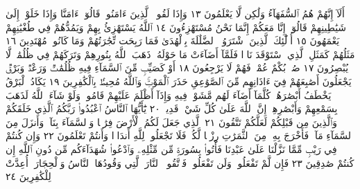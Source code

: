 \documentclass{article}
\begin{document}
أَلَآ إِنَّهُمْ هُمُ ٱلسُّفَهَآءُ وَلَٰكِن لَّا يَعْلَمُونَ ١٣ وَإِذَا لَقُوا۟
ٱلَّذِينَ ءَامَنُوا۟ قَالُوٓا۟ ءَامَنَّا وَإِذَا خَلَوْا۟ إِلَىٰ شَيَٰطِينِهِمْ قَالُوٓا۟ إِنَّا
مَعَكُمْ إِنَّمَا نَحْنُ مُسْتَهْزِءُونَ ١٤ ٱللَّهُ يَسْتَهْزِئُ بِهِمْ وَيَمُدُّهُمْ
فِي طُغْيَٰنِهِمْ يَعْمَهُونَ ١٥ أُو۟لَٰٓئِكَ ٱلَّذِينَ ٱشْتَرَوُا۟ ٱلضَّلَٰلَةَ
بِٱلْهُدَىٰ فَمَا رَبِحَت تِّجَٰرَتُهُمْ وَمَا كَانُوا۟ مُهْتَدِينَ ١٦
مَثَلُهُمْ كَمَثَلِ ٱلَّذِي ٱسْتَوْقَدَ نَارࣰا فَلَمَّآ أَضَآءَتْ مَا حَوْلَهُۥ
ذَهَبَ ٱللَّهُ بِنُورِهِمْ وَتَرَكَهُمْ فِي ظُلُمَٰتࣲ لَّا يُبْصِرُونَ ١٧ صُمُّۢ
بُكْمٌ عُمْيࣱ فَهُمْ لَا يَرْجِعُونَ ١٨ أَوْ كَصَيِّبࣲ مِّنَ ٱلسَّمَآءِ فِيهِ
ظُلُمَٰتࣱ وَرَعْدࣱ وَبَرْقࣱ يَجْعَلُونَ أَصَٰبِعَهُمْ فِيٓ ءَاذَانِهِم مِّنَ
ٱلصَّوَٰعِقِ حَذَرَ ٱلْمَوْتِۚ وَٱللَّهُ مُحِيطُۢ بِٱلْكَٰفِرِينَ ١٩ يَكَادُ ٱلْبَرْقُ
يَخْطَفُ أَبْصَٰرَهُمْۖ كُلَّمَآ أَضَآءَ لَهُم مَّشَوْا۟ فِيهِ وَإِذَآ أَظْلَمَ عَلَيْهِمْ
قَامُوا۟ۚ وَلَوْ شَآءَ ٱللَّهُ لَذَهَبَ بِسَمْعِهِمْ وَأَبْصَٰرِهِمْۚ إِنَّ ٱللَّهَ عَلَىٰ
كُلِّ شَيْءࣲ قَدِيرࣱ ٢٠ يَٰٓأَيُّهَا ٱلنَّاسُ ٱعْبُدُوا۟ رَبَّكُمُ ٱلَّذِي
خَلَقَكُمْ وَٱلَّذِينَ مِن قَبْلِكُمْ لَعَلَّكُمْ تَتَّقُونَ ٢١ ٱلَّذِي جَعَلَ لَكُمُ
ٱلْأَرْضَ فِرَٰشࣰا وَٱلسَّمَآءَ بِنَآءࣰ وَأَنزَلَ مِنَ ٱلسَّمَآءِ مَآءࣰ فَأَخْرَجَ
بِهِۦ مِنَ ٱلثَّمَرَٰتِ رِزْقࣰا لَّكُمْۖ فَلَا تَجْعَلُوا۟ لِلَّهِ أَندَادࣰا وَأَنتُمْ
تَعْلَمُونَ ٢٢ وَإِن كُنتُمْ فِي رَيْبࣲ مِّمَّا نَزَّلْنَا عَلَىٰ عَبْدِنَا فَأْتُوا۟
بِسُورَةࣲ مِّن مِّثْلِهِۦ وَٱدْعُوا۟ شُهَدَآءَكُم مِّن دُونِ ٱللَّهِ إِن
كُنتُمْ صَٰدِقِينَ ٢٣ فَإِن لَّمْ تَفْعَلُوا۟ وَلَن تَفْعَلُوا۟ فَٱتَّقُوا۟ ٱلنَّارَ
ٱلَّتِي وَقُودُهَا ٱلنَّاسُ وَٱلْحِجَارَةُۖ أُعِدَّتْ لِلْكَٰفِرِينَ ٢٤
\end{document}
